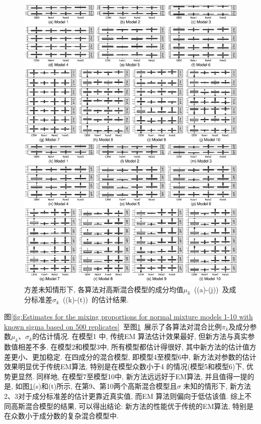 \documentclass[a4paper,12pt,openany,oneside,utf-8]{ctexbook}
\begin{document}
\begin{figure}[p]
  \centering
  \includegraphics[width = 1\textwidth]{Figure_5_Estimates_for_the_component_parameters_for_normal_mixture_models_with_unknown_sigma.eps}
  \caption{方差未知情形下, 各算法对高斯混合模型的成分均值$\mu_k$~((a)-(j))~及成分标准差$\sigma_k$~((k)-(t))~的估计结果.}
  \label{fig:Estimates for the component parameters for normal mixture models 1-10 with unknown sigma based on 500 replicates} %
\end{figure}

图\ref{fig:Estimates for the mixing proportions for normal mixture models 1-10 with known sigma based on 500 replicates}~至图\ref{fig:Estimates for the component parameters for normal mixture models 1-10 with unknown sigma based on 500 replicates}~展示了各算法对混合比例$\pi_k$及成分参数$\mu_k$、$\sigma_k$的估计情况. 在模型1 中, 传统EM 算法估计效果最好, 但新方法与真实参数值相差不多. 在模型2和模型3中, 所有模型都估计得很好, 其中新方法的估计值方差更小、更加稳定. 在四成分的混合模型, 即模型4至模型6中, 新方法对参数的估计效果明显优于传统EM算法, 特别是在模型众数小于4 的情况(模型5和模型6)下, 优势更显然. 同样地, 在模型7至模型10中, 新方法远远好于EM算法, 并且值得一提的是, 如图\ref{fig:Estimates for the component parameters for normal mixture models 1-10 with unknown sigma based on 500 replicates}(s)和(t)所示, 在第9、第10两个高斯混合模型且$\sigma$ 未知的情形下, 新方法2、3对于成分标准差的估计更靠近真实值, 而EM 算法则偏向于低估该值. 综上不同高斯混合模型的结果, 可以得出结论: 新方法的性能优于传统的EM算法, 特别是在众数小于成分数的复杂混合模型中.
\end{document}
